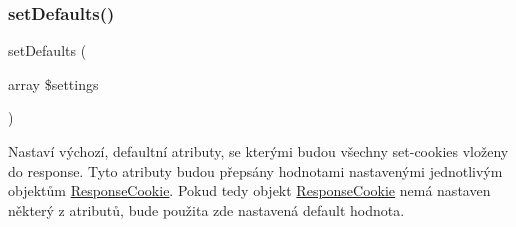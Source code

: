 \subsubsection{\texorpdfstring{set\+Defaults()}{setDefaults()}}
{\footnotesize\ttfamily set\+Defaults (\begin{DoxyParamCaption}\item[{array}]{\$settings }\end{DoxyParamCaption})}

Nastaví výchozí, defaultní atributy, se kterými budou všechny set-\/cookies vloženy do response. Tyto atributy budou přepsány hodnotami nastavenými jednotlivým objektům \mbox{\hyperlink{class_pes_1_1_http_1_1_cookies_1_1_response_cookie}{Response\+Cookie}}. Pokud tedy objekt \mbox{\hyperlink{class_pes_1_1_http_1_1_cookies_1_1_response_cookie}{Response\+Cookie}} nemá nastaven některý z atributů, bude použita zde nastavená default hodnota.

